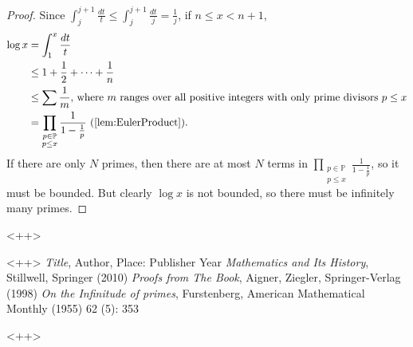 \documentclass[a4paper]{article}
\theoremstyle{definition}
\theoremstyle{remark}
\begin{document}
\begin{proof}
  Since $\int_j^{j+1}\frac{dt}{t}\le\int_j^{j+1}\frac{dt}{j}=\frac{1}{j}$, if $n\le x<n+1$, 
  \begin{align*}
  \log x&=\int_1^x\frac{dt}{t}\\
  &\le1+\frac{1}{2}+\dots+\frac{1}{n}\\
  &\le\sum\frac{1}{m}\text{, where $m$ ranges over all positive integers with only prime divisors $p\le x$}\\
  &=\prod\limits_{\substack{p\in\mathbb{P}\\p\le x}}\frac{1}{1-\frac{1}{p}}\text{ (\cref{lem:EulerProduct})}
  .
\end{align*}
If there are only $N$ primes, then there are at most $N$ terms in $\displaystyle\prod\limits_{\substack{p\in\mathbb{P}\\p\le x}}\frac{1}{1-\frac{1}{p}}$, so it must be bounded. But clearly $\log x$ is not bounded, so there must be infinitely many primes.
\end{proof}<++>


\begin{thebibliography}{12}
   <++>
    \textit{Title}, Author, Place: Publisher Year
    \textit{Mathematics and Its History}, Stillwell, Springer (2010)
    \textit{Proofs from The Book}, Aigner, Ziegler, Springer-Verlag (1998)
    \textit{On the Infinitude of primes}, Furstenberg, American Mathematical Monthly (1955) 62 (5): 353
\end{thebibliography}<++>
\end{document}
